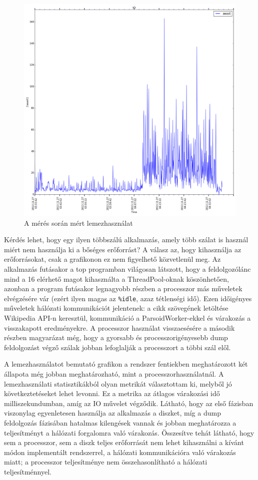 \begin{figure}[htb]
\centering
\includegraphics[scale=0.3]{img/measurement_io}
\caption{A mérés során mért lemezhasználat}
\label{fig:measurement_io}
\end{figure}

Kérdés lehet, hogy egy ilyen többszálú alkalmazás, amely több szálat is használ miért nem használja ki a bőséges erőforrást? A válasz az, hogy kihasználja az erőforrásokat, csak a grafikonon ez nem figyelhető közvetlenül meg. Az alkalmazás futásakor a top programban világosan látszott, hogy a feldolgozólánc mind a 16 elérhető magot kihasználta a ThreadPool-oknak köszönhetően, azonban a program futásakor legnagyobb részben a processzor más műveletek elvégzésére vár (ezért ilyen magas az \texttt{\%idle}, azaz tétlenségi idő). Ezen időigényes műveletek hálózati kommunikációt jelentenek: a cikk szövegének letöltése Wikipedia API-n keresztül, kommunikáció a ParsoidWorker-ekkel és várakozás a visszakapott eredményekre. A processzor használat visszaesésére a második részben magyarázat még, hogy a gyorsabb és processzorigényesebb dump feldolgozást végző szálak jobban lefoglalják a processzort a többi szál elől.

A lemezhasználatot bemutató grafikon a rendszer fentiekben meghatározott két állapota még jobban meghatározható, mint a processzorhasználatnál. A lemezhasználati statisztikákból olyan metrikát választottam ki, melyből jó következtetéseket lehet levonni. Ez a metrika az átlagos várakozási idő milliszekundumban, amíg az IO művelet végződik. Látható, hogy az első fázisban viszonylag egyenletesen használja az alkalmazás a diszket, míg a dump feldolgozás fázisában hatalmas kilengések vannak és jobban meghatározza a teljesítményt a hálózati forgalomra való várakozás. Összesítve tehát látható, hogy sem a processzor, sem a diszk teljes erőforrását nem lehet kihasználni a kívánt módon implementált rendszerrel, a hálózati kommunikációra való várakozás miatt; a processzor teljesítménye nem összehasonlítható a hálózati teljesítménnyel.


